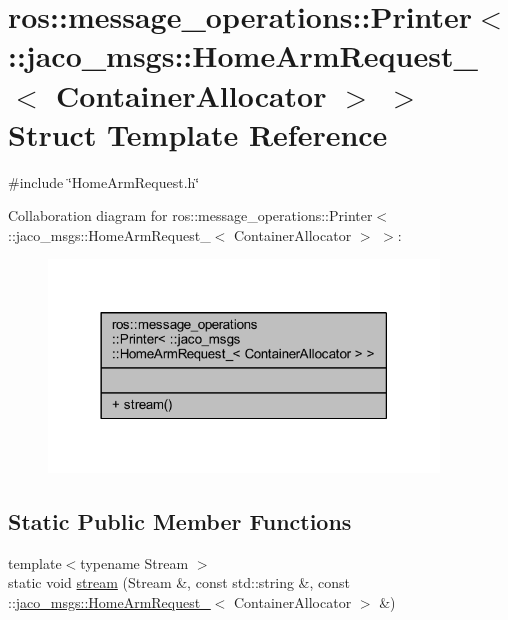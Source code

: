 \hypertarget{structros_1_1message__operations_1_1Printer_3_01_1_1jaco__msgs_1_1HomeArmRequest___3_01ContainerAllocator_01_4_01_4}{}\section{ros\+:\+:message\+\_\+operations\+:\+:Printer$<$ \+:\+:jaco\+\_\+msgs\+:\+:Home\+Arm\+Request\+\_\+$<$ Container\+Allocator $>$ $>$ Struct Template Reference}
\label{structros_1_1message__operations_1_1Printer_3_01_1_1jaco__msgs_1_1HomeArmRequest___3_01ContainerAllocator_01_4_01_4}


{\ttfamily \#include \char`\"{}Home\+Arm\+Request.\+h\char`\"{}}



Collaboration diagram for ros\+:\+:message\+\_\+operations\+:\+:Printer$<$ \+:\+:jaco\+\_\+msgs\+:\+:Home\+Arm\+Request\+\_\+$<$ Container\+Allocator $>$ $>$\+:
\nopagebreak
\begin{figure}[H]
\begin{center}
\leavevmode
\includegraphics[width=294pt]{da/d0b/structros_1_1message__operations_1_1Printer_3_01_1_1jaco__msgs_1_1HomeArmRequest___3_01Container4314913afa4858d5566c866f9391fbc1}
\end{center}
\end{figure}
\subsection*{Static Public Member Functions}
\begin{DoxyCompactItemize}
\item 
{\footnotesize template$<$typename Stream $>$ }\\static void \hyperlink{structros_1_1message__operations_1_1Printer_3_01_1_1jaco__msgs_1_1HomeArmRequest___3_01ContainerAllocator_01_4_01_4_a8384d9c3f7ee00f66c2b18879088b8a1}{stream} (Stream \&, const std\+::string \&, const \+::\hyperlink{structjaco__msgs_1_1HomeArmRequest__}{jaco\+\_\+msgs\+::\+Home\+Arm\+Request\+\_\+}$<$ Container\+Allocator $>$ \&)
\end{DoxyCompactItemize}


